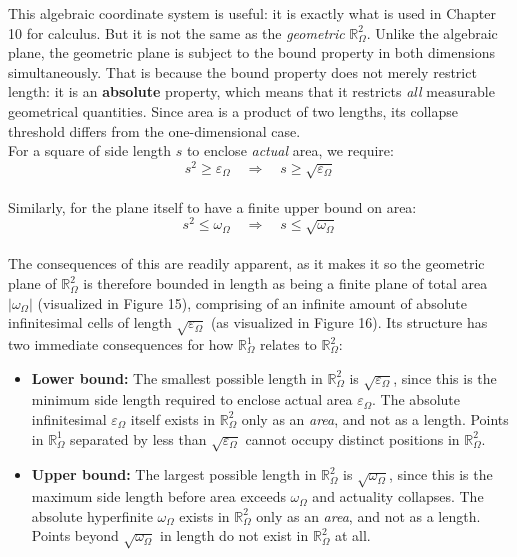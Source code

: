 \documentclass{article}
\begin{document}
This algebraic coordinate system is useful: it is exactly what is used in 
Chapter 10 for calculus. But it is not the same as the \textit{geometric} $\mathbb{R}_\Omega^2$. Unlike the algebraic 
plane, the geometric plane is subject to the bound property in both 
dimensions simultaneously. That is because the bound property does not merely restrict 
length: it is an \textbf{absolute} property, which means that it restricts \textit{all} measurable geometrical quantities. Since 
area is a product of two lengths, its collapse threshold differs from the 
one-dimensional case.
\\For a square of side length $s$ to enclose \textit{actual} area, we require:
$$s^2 \geq \varepsilon_\Omega \quad \Rightarrow \quad s \geq \sqrt{\varepsilon_\Omega}$$
\\Similarly, for the plane itself to have a finite upper bound on area:
$$s^2 \leq \omega_\Omega \quad \Rightarrow \quad s \leq \sqrt{\omega_\Omega}$$
\\The consequences of this are readily apparent, as it makes it so the geometric plane of $\mathbb{R}_\Omega^2$ is therefore bounded in length as being a finite plane of total area $|\omega_\Omega|$ (visualized in Figure 15), comprising of an infinite amount of absolute infinitesimal cells of length $\sqrt{\varepsilon_\Omega}$ (as visualized 
in Figure 16). Its structure has two immediate 
consequences for how $\mathbb{R}_\Omega^1$ relates to $\mathbb{R}_\Omega^2$:

\begin{itemize}
\item \textbf{Lower bound:} The smallest possible length in 
$\mathbb{R}_\Omega^2$ is $\sqrt{\varepsilon_\Omega}$, since this is 
the minimum side length required to enclose actual area $\varepsilon_\Omega$. 
The absolute infinitesimal $\varepsilon_\Omega$ itself exists in 
$\mathbb{R}_\Omega^2$ only as an \textit{area}, and  not as a length. 
Points in $\mathbb{R}_\Omega^1$ separated by less than $\sqrt{\varepsilon_\Omega}$ 
cannot occupy distinct positions in $\mathbb{R}_\Omega^2$.

\item \textbf{Upper bound:} The largest possible length in 
$\mathbb{R}_\Omega^2$ is $\sqrt{\omega_\Omega}$, since this is the 
maximum side length before area exceeds $\omega_\Omega$ and actuality 
collapses. The absolute hyperfinite $\omega_\Omega$ exists in 
$\mathbb{R}_\Omega^2$ only as an \textit{area}, and not as a length. 
Points beyond $\sqrt{\omega_\Omega}$ in length do not exist in 
$\mathbb{R}_\Omega^2$ at all.
\end{itemize}
\end{document}
